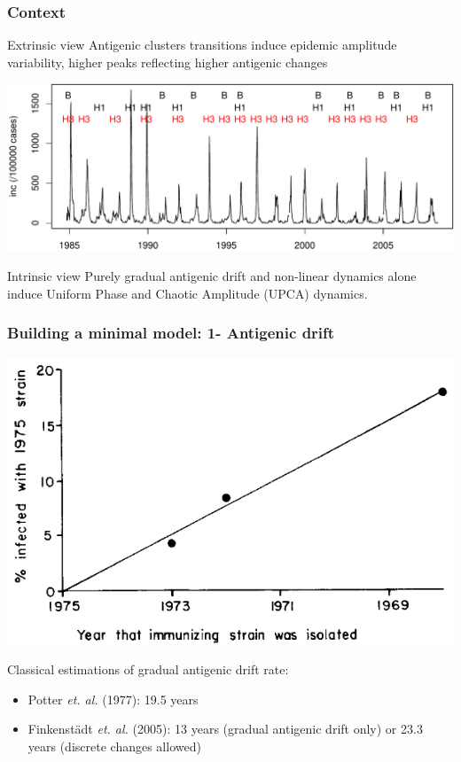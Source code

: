 \documentclass{beamer}
\begin{document}
\begin{frame}
  \frametitle{Context}

  \begin{block}{Extrinsic view}
  Antigenic clusters transitions induce epidemic amplitude
  variability, higher peaks reflecting higher antigenic changes    
  \end{block}

  \begin{center}
    \includegraphics[width=0.7 \linewidth]{graph/data_flu.pdf}
  \end{center}
\pause

  \begin{alertblock}{Intrinsic view}
    Purely gradual antigenic drift and non-linear dynamics alone
    induce Uniform Phase and Chaotic Amplitude (UPCA) dynamics.
  \end{alertblock}
\end{frame}



\begin{frame}
  \frametitle{Building a minimal model: 1- Antigenic drift}
  \begin{center}
    \includegraphics[width=0.4 \linewidth]{graph/pease2.png}
  \end{center}

Classical estimations of \alert{gradual} antigenic drift rate:
  \begin{itemize}
  \item Potter \textit{et. al.} (1977): 19.5 years
  \item Finkenstädt \textit{et. al.} (2005): 13 years (gradual antigenic drift only) or 23.3 years (discrete changes allowed)
  \end{itemize}
\end{frame}
\end{document}
